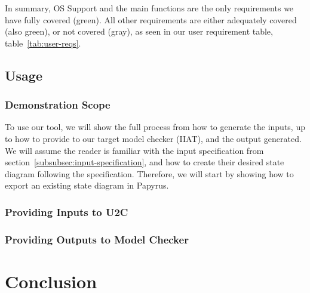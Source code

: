 \documentclass[11pt]{article}
\begin{document}
    In summary, OS Support and the main functions are the only requirements we have fully covered (green).
    All other requirements are either adequately covered (also green), or not covered (gray),
    as seen in our user requirement table, table~\ref{tab:user-reqs}.


    \subsection{Usage}\label{subsec:usage}
    \subsubsection{Demonstration Scope}
    To use our tool, we will show the full process from how to generate the inputs,
    up to how to provide to our target model checker (IIAT), and the output generated.
    We will assume the reader is familiar with the input specification from section~\ref{subsubsec:input-specification},
    and how to create their desired state diagram following the specification.
    Therefore, we will start by showing how to export an existing state diagram in Papyrus.

    \subsubsection{Providing Inputs to U2C}

    \subsubsection{Providing Outputs to Model Checker}


    \section{Conclusion}\label{sec:conclusion}
    
\end{document}
